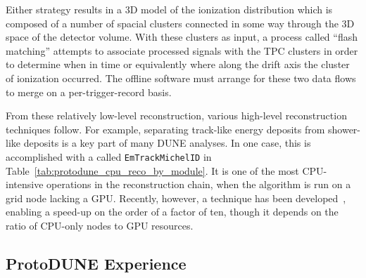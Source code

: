 \documentclass[../main-v1.tex]{subfiles}
\begin{document}
Either strategy results in a 3D model of the ionization distribution which is composed of a number of spacial clusters connected in some way through the 3D space of the detector volume.
With these clusters as input, a process called ``flash matching'' attempts to associate processed  signals with the TPC clusters in order to determine when in time or equivalently where along the drift axis the cluster of ionization occurred.
The offline software must arrange for these two data flows to merge on a per-trigger-record basis.

From these relatively low-level reconstruction, various high-level reconstruction techniques follow.
For example, separating track-like energy deposits from shower-like deposits is a key part of many DUNE analyses. 
In one case, this is accomplished with a  called {\tt EmTrackMichelID} in Table~\ref{tab:protodune_cpu_reco_by_module}. 
It is one of the most CPU-intensive operations in the  reconstruction chain, when the algorithm is run on a grid node lacking a GPU. 
Recently, however, a  technique has been developed~\cite{Wang:2020fjr}, enabling a speed-up on the order of a factor of ten, though it depends on the ratio of CPU-only nodes to GPU resources.


\subsection{ProtoDUNE Experience}
\end{document}
